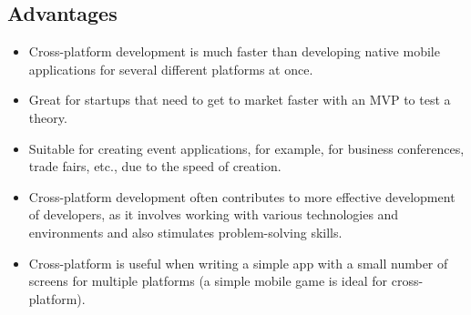 \documentclass[conference]{IEEEtran}
\begin{document}
\subsection{Advantages}
\begin{itemize}
\item Cross-platform development is much faster than developing native mobile applications for several different platforms at once.

\item Great for startups that need to get to market faster with an MVP to test a theory.
\item Suitable for creating event applications, for example, for business conferences, trade fairs, etc., due to the speed of creation.

\item Cross-platform development often contributes to more effective development of developers, as it involves working with various technologies and environments and also stimulates problem-solving skills.

\item Cross-platform is useful when writing a simple app with a small number of screens for multiple platforms (a simple mobile game is ideal for cross-platform).
\end{itemize}
\end{document}
